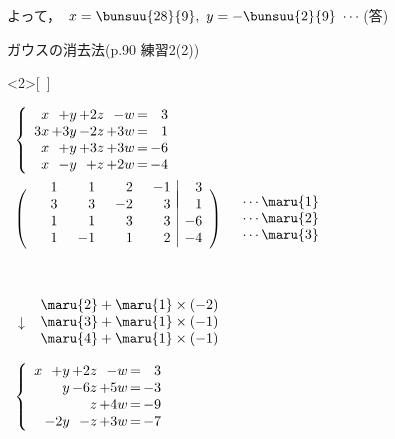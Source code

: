 \documentclass[a4paper,10pt,onecolumn,oneside,notitlepage,final]{jsarticle} %
\begin{document}
\begin{CKdata}
\qquad よって，\ {$x=\bunsuu{28}{9},\ y=-\bunsuu{2}{9}\ \cdots$(答)}

\newpage

\noindent ガウスの消去法(p.90 練習2(2))\\ %

\begin{edaenumerate}<2>[\ ]%

\item\ 
$\left\{\begin{array}{r@{\,}r@{\,}r@{\,}r@{\,=\,}r}
  x&  +y& +2z&  -w&  3\\
 3x& +3y& -2z& +3w&  1\\
  x&  +y& +3z& +3w& -6\\
  x&  -y&  +z& +2w& -4
\end{array}\right.$
\item\ 
$\left(\begin{array}{rrrr|r}
\hspace{6mm}&\hspace{6mm}&\hspace{6mm}&\hspace{6mm}\\[-7mm]
  1&   1&   2&  -1&  3\\
  3&   3&  -2&   3&  1\\
  1&   1&   3&   3& -6\\
  1&  -1&   1&   2& -4
\end{array}\right)$
\ 
$\begin{array}{r}
\cdots\maru{1}\\ \cdots\maru{2}\\ \cdots\maru{3}
\end{array}$
\item\ \item\ $\downarrow$ $\begin{array}{l}
\maru{2}+\maru{1}\times(-2)\\
\maru{3}+\maru{1}\times(-1)\\
\maru{4}+\maru{1}\times(-1)
\end{array}$
\item\ 
$\left\{\begin{array}{r@{\,}r@{\,}r@{\,}r@{\,=\,}r}
  x&  +y& +2z&  -w&  3\\
   &   y& -6z& +5w& -3\\
   &    &   z& +4w& -9\\
   & -2y&  -z& +3w& -7
\end{array}\right.$
\item\ 

\end{edaenumerate}
\end{CKdata}
\end{document}
